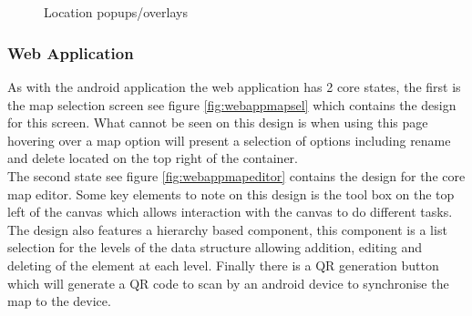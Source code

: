 \begin{figure}[h]
	\centering
	\begin{subfigure}[h]{.5\textwidth}
		\centering
		\\
		\caption{}
		\label{fig:locationpopupoptions}
	\end{subfigure}%
	\begin{subfigure}[h]{.5\textwidth}
		\centering
		\\
		\caption{}
		\label{fig:locationpopupsearch}
	\end{subfigure}
	\caption{Location popups/overlays}
	\label{fig:locationpopup}
\end{figure}


\pagebreak
\subsubsection{Web Application}
As with the android application the web application has 2 core states, the first is the map selection screen see figure \ref{fig:webappmapsel} which contains the design for this screen. What cannot be seen on this design is when using this page hovering over a map option will present a selection of options including rename and delete located on the top right of the container.\\

The second state see figure \ref{fig:webappmapeditor} contains the design for the core map editor. Some key elements to note on this design is the tool box on the top left of the canvas which allows interaction with the canvas to do different tasks. The design also features a hierarchy based component, this component is a list selection for the levels of the data structure allowing addition, editing and deleting of the element at each level. Finally there is a QR generation button which will generate a QR code to scan by an android device to synchronise the map to the device.

